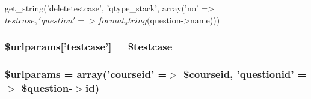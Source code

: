 \begin{DoxyCode}
 get_string('deletetestcase', 'qtype_stack',
        array('no' => $testcase, 'question' => format_string($question->name)))
\end{DoxyCode}
\hypertarget{questiontestdelete_8php_a0ebc1f55faa70ed8b77a39b4d6f88d03}{
\subsubsection[{\$urlparams}]{\setlength{\rightskip}{0pt plus 5cm}\$urlparams\mbox{[}'testcase'\mbox{]} = \$testcase}}
\label{questiontestdelete_8php_a0ebc1f55faa70ed8b77a39b4d6f88d03}
\hypertarget{questiontestdelete_8php_a1aa950c4029aca228dd33a4b27109e00}{
\subsubsection[{\$urlparams}]{\setlength{\rightskip}{0pt plus 5cm}\$urlparams = array('courseid' =$>$ \$courseid, 'questionid' =$>$ \$question-\/$>$id)}}
\label{questiontestdelete_8php_a1aa950c4029aca228dd33a4b27109e00}
